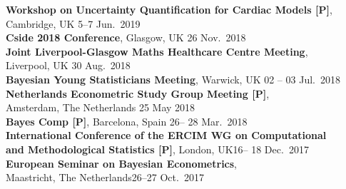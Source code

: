 \documentclass[margin,line]{resume}
\begin{document}
\begin{resume}
	\textbf{Workshop on Uncertainty Quantification for Cardiac Models [P]},\\
	Cambridge, UK \hfill 5--7 Jun.\ 2019 \vspace{1mm} \\		
	\textbf{Cside 2018 Conference}, Glasgow, UK \hfill 26 Nov.\ 2018 \vspace{1mm} \\
	\textbf{ Joint Liverpool-Glasgow Maths Healthcare Centre Meeting},\\
	Liverpool, UK \hfill 30 Aug.\ 2018 \vspace{1mm} \\			
	\textbf{ Bayesian Young Statisticians Meeting}, Warwick, UK \hfill 02 -- 03 Jul.\ 2018 \vspace{1mm} \\
	\textbf{ Netherlands Econometric Study Group Meeting [P]}, \\
	Amsterdam, The Netherlands \hfill 25 May 2018  \vspace{1mm} \\ 		
	\textbf{ Bayes Comp [P]}, Barcelona, Spain \hfill 26-- 28 Mar.\ 2018 \vspace{1mm} \\
	\textbf{ International Conference of the ERCIM WG on Computational}\\
	\textbf{and Methodological Statistics [P]}, London, UK\hfill 16-- 18 Dec.\ 2017 \vspace{1mm} \\ 	
	\textbf{ European Seminar on Bayesian Econometrics},\\
	 Maastricht, The Netherlands\hfill 26--27 Oct.\ 2017 \vspace{1mm} \\
\newpage	


\end{resume}
\end{document}
